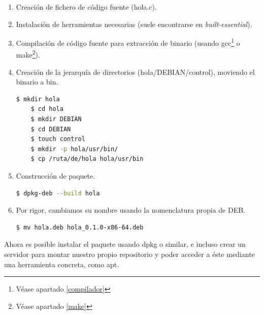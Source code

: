 \documentclass[a4paper, 11pt, titlepage]{article}
\begin{document}
            \begin{enumerate}
                \item Creación de fichero de código fuente (hola.c).
                \item Instalación de herramientas necesarias (suele encontrarse en \textit{built-essential}).
                \item Compilación de código fuente para extracción de binario (usando gcc\footnote{Véase apartado 
                \ref{compilador}} o make\footnote{Véase apartado \ref{make}}).
                \item Creación de la jerarquía de directorios (hola/DEBIAN/control), moviendo el binario a bin.
                
                \begin{lstlisting}[language=bash]
    $ mkdir hola
    $ cd hola
    $ mkdir DEBIAN
    $ cd DEBIAN
    $ touch control
    $ mkdir -p hola/usr/bin/
    $ cp /ruta/de/hola hola/usr/bin\end{lstlisting}

                \item Construcción de paquete.
                
                \begin{lstlisting}[language=bash]
    $ dpkg-deb --build hola\end{lstlisting}
                
                \item Por rigor, cambiamos su nombre usando la nomenclatura propia de DEB.
                
                \begin{lstlisting}[language=bash]
    $ mv hola.deb hola_0.1.0-x86-64.deb\end{lstlisting}

            \end{enumerate}

            Ahora es posible instalar el paquete usando dpkg o similar, e incluso crear un servidor para 
            montar nuestro propio repositorio y poder acceder a éste mediante una herramienta concreta, como 
            apt.


\end{document}
